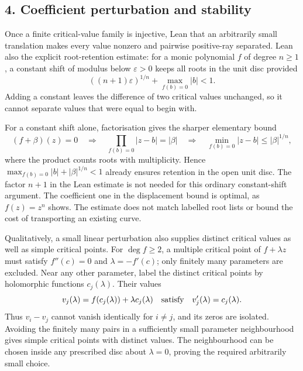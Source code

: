 \subsection*{4. Coefficient perturbation and stability}

Once a finite critical-value family is injective, Lean
that an arbitrarily small translation makes every value nonzero and
pairwise positive-ray separated.  Lean also
the explicit root-retention estimate: for a monic polynomial $f$ of degree
$n\ge1$, a constant shift of modulus below $\varepsilon>0$ keeps all roots
in the unit disc provided
\[
 ((n+1)\varepsilon)^{1/n}+\max_{f(b)=0}|b|<1.
\]
Adding a constant leaves the difference of two critical values unchanged,
so it cannot separate values that were equal to begin with.

For a constant shift alone, factorisation gives the sharper elementary
bound
\[
 (f+\beta)(z)=0\quad\Longrightarrow\quad
 \prod_{f(b)=0}|z-b|=|\beta|
 \quad\Longrightarrow\quad
 \min_{f(b)=0}|z-b|\le|\beta|^{1/n},
\]
where the product counts roots with multiplicity. Hence
$\max_{f(b)=0}|b|+|\beta|^{1/n}<1$ already ensures retention in the
open unit disc. The factor $n+1$ in the Lean estimate is not
needed for this ordinary constant-shift argument. The coefficient one
in the displacement bound is optimal, as $f(z)=z^n$ shows. The estimate
does not match labelled root lists or bound the cost of transporting
an existing curve.

Qualitatively, a small linear perturbation also supplies distinct
critical values as well as simple critical points. For $\deg f\ge2$,
a multiple critical point of $f+\lambda z$ must satisfy
$f''(c)=0$ and $\lambda=-f'(c)$; only finitely many parameters are
excluded. Near any other parameter, label the distinct critical points
by holomorphic functions $c_j(\lambda)$. Their values
\[
 v_j(\lambda)=f(c_j(\lambda))+\lambda c_j(\lambda)
 \quad\hbox{satisfy}\quad v_j'(\lambda)=c_j(\lambda).
\]
Thus $v_i-v_j$ cannot vanish identically for $i\ne j$, and its zeros
are isolated. Avoiding the finitely many pairs in a sufficiently small
parameter neighbourhood gives simple critical points with distinct
values. The neighbourhood can be chosen inside any prescribed disc
about $\lambda=0$, proving the required arbitrarily small choice.

